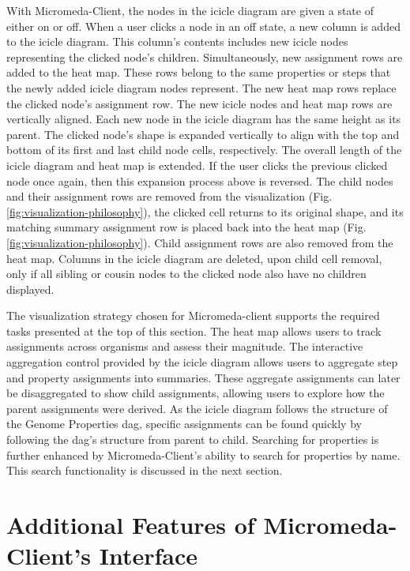 With Micromeda-Client, the nodes in the icicle diagram are given a state of either on or off. When a user clicks a node in an off state, a new column is added to the icicle diagram. This column's contents includes new icicle nodes representing the clicked node's children. Simultaneously, new assignment rows are added to the heat map. These rows belong to the same properties or steps that the newly added icicle diagram nodes represent. The new heat map rows replace the clicked node's assignment row. The new icicle nodes and heat map rows are vertically aligned. Each new node in the icicle diagram has the same height as its parent. The clicked node's shape is expanded vertically to align with the top and bottom of its first and last child node cells, respectively. The overall length of the icicle diagram and heat map is extended. If the user clicks the previous clicked node once again, then this expansion process above is reversed. The child nodes and their assignment rows are removed from the visualization (Fig. \ref{fig:visualization-philosophy}), the clicked cell returns to its original shape, and its matching summary assignment row is placed back into the heat map (Fig. \ref{fig:visualization-philosophy}). Child assignment rows are also removed from the heat map. Columns in the icicle diagram are deleted, upon child cell removal, only if all sibling or cousin nodes to the clicked node also have no children displayed.

The visualization strategy chosen for Micromeda-client supports the required tasks presented at the top of this section. The heat map allows users to track assignments across organisms and assess their magnitude. The interactive aggregation control provided by the icicle diagram allows users to aggregate step and property assignments into summaries. These aggregate assignments can later be disaggregated to show child assignments, allowing users to explore how the parent assignments were derived. As the icicle diagram follows the structure of the Genome Properties \gls{dag}, specific assignments can be found quickly by following the \gls{dag}'s structure from parent to child. Searching for properties is further enhanced by Micromeda-Client's ability to search for properties by name. This search functionality is discussed in the next section.

\section{Additional Features of Micromeda-Client's Interface} \label{client-additional-features}

